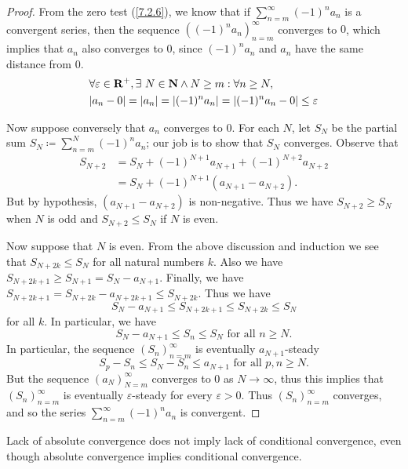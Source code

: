 \begin{proof}
  From the zero test (\cref{7.2.6}), we know that if \(\sum_{n = m}^\infty (-1)^n a_n\) is a convergent series, then the sequence \(((-1)^n a_n)_{n = m}^\infty\) converges to \(0\), which implies that \(a_n\) also converges to \(0\), since \((-1)^n a_n\) and \(a_n\) have the same distance from \(0\).
  \begin{align*}
     & \forall \varepsilon \in \R^+, \exists\ N \in \N \land N \geq m : \forall n \geq N,   \\
     & \abs{a_n - 0} = \abs{a_n} = \abs{(-1)^n a_n} = \abs{(-1)^n a_n - 0} \leq \varepsilon
  \end{align*}

  Now suppose conversely that \(a_n\) converges to \(0\).
  For each \(N\), let \(S_N\) be the partial sum \(S_N \coloneqq \sum_{n = m}^N (-1)^n a_n\);
  our job is to show that \(S_N\) converges.
  Observe that
  \begin{align*}
    S_{N + 2} & = S_N + (-1)^{N + 1} a_{N + 1} + (-1)^{N + 2} a_{N + 2} \\
              & = S_N + (-1)^{N + 1} (a_{N + 1} - a_{N + 2}).
  \end{align*}
  But by hypothesis, \((a_{N + 1} - a_{N + 2})\) is non-negative.
  Thus we have \(S_{N + 2} \geq S_N\) when \(N\) is odd and \(S_{N + 2} \leq S_N\) if \(N\) is even.

  Now suppose that \(N\) is even.
  From the above discussion and induction we see that \(S_{N + 2k} \leq S_N\) for all natural numbers \(k\).
  Also we have \(S_{N + 2k + 1} \geq S_{N + 1} = S_N - a_{N + 1}\).
  Finally, we have \(S_{N + 2k + 1} = S_{N + 2k} - a_{N + 2k + 1} \leq S_{N + 2k}\).
  Thus we have
  \[
    S_N - a_{N + 1} \leq S_{N + 2k + 1} \leq S_{N + 2k} \leq S_N
  \]
  for all \(k\).
  In particular, we have
  \[
    S_N - a_{N + 1} \leq S_n \leq S_N \text{ for all } n \geq N.
  \]
  In particular, the sequence \((S_n)_{n = m}^\infty\) is eventually \(a_{N + 1}\)-steady
  \[
    S_p - S_n \leq S_N - S_n \leq a_{N + 1} \text{ for all } p, n \geq N.
  \]
  But the sequence \((a_N)_{N = m}^\infty\) converges to \(0\) as \(N \to \infty\), thus this implies that \((S_n)_{n = m}^\infty\) is eventually \(\varepsilon\)-steady for every \(\varepsilon > 0\).
  Thus \((S_n)_{n = m}^\infty\) converges, and so the series \(\sum_{n = m}^\infty (-1)^n a_n\) is convergent.
\end{proof}

\begin{note}
  Lack of absolute convergence does not imply lack of conditional convergence, even though absolute convergence implies conditional convergence.
\end{note}

